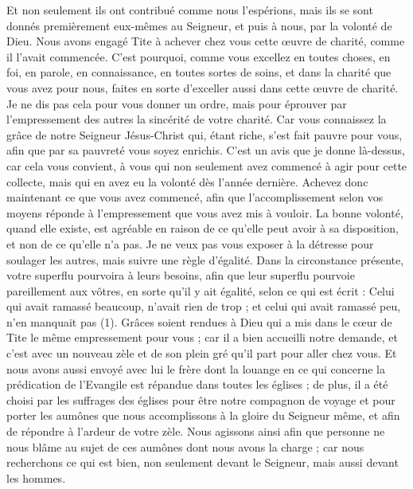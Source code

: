 \begin{multicols}{2}
Et non seulement ils ont contribué comme nous l’espérions, mais ils se sont donnés premièrement eux-mêmes au Seigneur, et puis à nous, par la volonté de Dieu.
Nous avons engagé Tite à achever chez vous cette œuvre de charité, comme il l’avait commencée.
C'est pourquoi, comme vous excellez en toutes choses, en foi, en parole, en connaissance, en toutes sortes de soins, et dans la charité que vous avez pour nous, faites en sorte d’exceller aussi dans cette œuvre de charité.
Je ne dis pas cela pour vous donner un ordre, mais pour éprouver par l’empressement des autres la sincérité de votre charité.
Car vous connaissez la grâce de notre Seigneur Jésus-Christ qui, étant riche, s'est fait pauvre pour vous, afin que par sa pauvreté vous soyez enrichis.
C’est un avis que je donne là-dessus, car cela vous convient, à vous qui non seulement avez commencé à agir pour cette collecte, mais qui en avez eu la volonté dès l’année dernière.
Achevez donc maintenant ce que vous avez commencé, afin que l’accomplissement selon vos moyens réponde à l’empressement que vous avez mis à vouloir.
La bonne volonté, quand elle existe, est agréable en raison de ce qu’elle peut avoir à sa disposition, et non de ce qu’elle n’a pas.
Je ne veux pas vous exposer à la détresse pour soulager les autres, mais suivre une règle d’égalité. Dans la circonstance présente, votre superflu pourvoira à leurs besoins,
afin que leur superflu pourvoie pareillement aux vôtres, en sorte qu’il y ait égalité,
selon ce qui est écrit : Celui qui avait ramassé beaucoup, n'avait rien de trop ; et celui qui avait ramassé peu, n'en manquait pas (1).
Grâces soient rendues à Dieu qui a mis dans le cœur de Tite le même empressement pour vous ;
car il a bien accueilli notre demande, et c’est avec un nouveau zèle et de son plein gré qu’il part pour aller chez vous.
Et nous avons aussi envoyé avec lui le frère dont la louange en ce qui concerne la prédication de l'Evangile est répandue dans toutes les églises ;
de plus, il a été choisi par les suffrages des églises pour être notre compagnon de voyage et pour porter les aumônes que nous accomplissons à la gloire du Seigneur même, et afin de répondre à l’ardeur de votre zèle.
Nous agissons ainsi afin que personne ne nous blâme au sujet de ces aumônes dont nous avons la charge ;
car nous recherchons ce qui est bien, non seulement devant le Seigneur, mais aussi devant les hommes.

\end{multicols}
